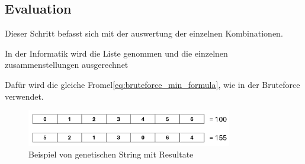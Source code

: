 %
%
%
%
\subsection{Evaluation
\label{genetic_algorithm:evaluation}}
Dieser Schritt befasst sich mit der auswertung der einzelnen 
Kombinationen.

In der Informatik wird die Liste genommen und die einzelnen 
zusammenstellungen ausgerechnet

Dafür wird die gleiche Fromel\ref{eq:bruteforce_min_formula}, 
wie in der Bruteforce verwendet.

\begin{figure} [h]
	\centering
	\includegraphics[width=0.8\textwidth]{
        papers/variationsprinzip_algorithmen/images/teil3/03_genetic_string_cities_results.png
        }
	\caption{Beispiel von genetischen String mit Resultate}
	\label{fig:cities_genetic_string_results}
\end{figure}

